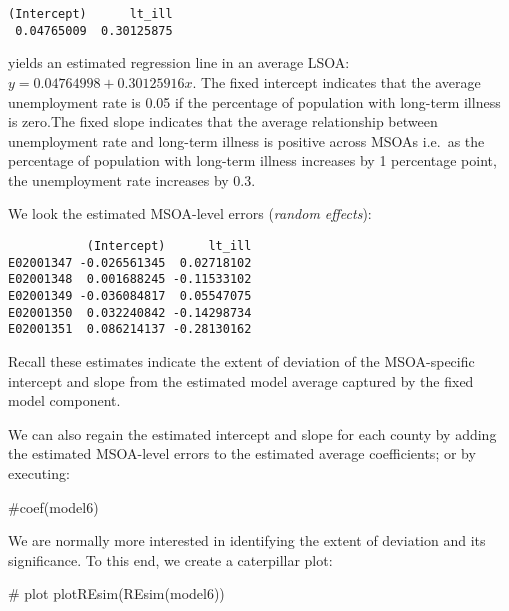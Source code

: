 \documentclass[
  letterpaper,
  krantz2]{style/krantz}
\newenvironment{Shaded}{\begin{snugshade}}{\end{snugshade}}
\newcommand{\CommentTok}[1]{\textcolor[rgb]{0.37,0.37,0.37}{#1}}
\newcommand{\DecValTok}[1]{\textcolor[rgb]{0.68,0.00,0.00}{#1}}
\newcommand{\FunctionTok}[1]{\textcolor[rgb]{0.28,0.35,0.67}{#1}}
\newcommand{\NormalTok}[1]{\textcolor[rgb]{0.00,0.23,0.31}{#1}}
\newcommand{\OtherTok}[1]{\textcolor[rgb]{0.00,0.23,0.31}{#1}}
\newcommand{\SpecialCharTok}[1]{\textcolor[rgb]{0.37,0.37,0.37}{#1}}
\begin{document}
\begin{verbatim}
(Intercept)      lt_ill 
 0.04765009  0.30125875 
\end{verbatim}

yields an estimated regression line in an average LSOA:
\(y = 0.04764998 + 0.30125916x\). The fixed intercept indicates that the
average unemployment rate is 0.05 if the percentage of population with
long-term illness is zero.The fixed slope indicates that the average
relationship between unemployment rate and long-term illness is positive
across MSOAs i.e.~as the percentage of population with long-term illness
increases by 1 percentage point, the unemployment rate increases by 0.3.

We look the estimated MSOA-level errors (\emph{random effects}):

\begin{Shaded}
\end{Shaded}

\begin{verbatim}
           (Intercept)      lt_ill
E02001347 -0.026561345  0.02718102
E02001348  0.001688245 -0.11533102
E02001349 -0.036084817  0.05547075
E02001350  0.032240842 -0.14298734
E02001351  0.086214137 -0.28130162
\end{verbatim}

Recall these estimates indicate the extent of deviation of the
MSOA-specific intercept and slope from the estimated model average
captured by the fixed model component.

We can also regain the estimated intercept and slope for each county by
adding the estimated MSOA-level errors to the estimated average
coefficients; or by executing:

\begin{Shaded}
\begin{Highlighting}[]
\CommentTok{\#coef(model6)}
\end{Highlighting}
\end{Shaded}

We are normally more interested in identifying the extent of deviation
and its significance. To this end, we create a caterpillar plot:

\begin{Shaded}
\begin{Highlighting}[]
\CommentTok{\# plot}
\FunctionTok{plotREsim}\NormalTok{(}\FunctionTok{REsim}\NormalTok{(model6))}
\end{Highlighting}
\end{Shaded}
\end{document}
